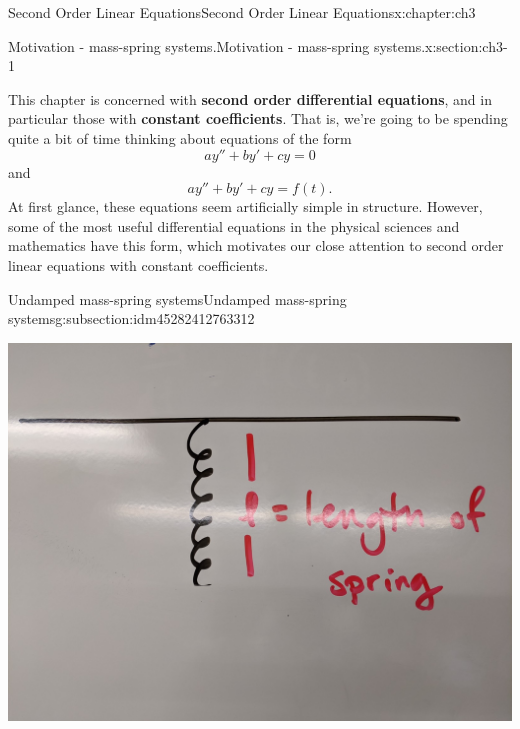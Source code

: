 \documentclass[oneside,10pt,]{book}
\newcommand{\terminology}[1]{\textbf{#1}}
\numberwithin{equation}{section}
\numberwithin{equation}{section}
\begin{document}
\begin{chapterptx}{Second Order Linear Equations}{}{Second Order Linear Equations}{}{}{x:chapter:ch3}
%
%
\typeout{************************************************}
\typeout{************************************************}
%
\begin{sectionptx}{Motivation - mass-spring systems.}{}{Motivation - mass-spring systems.}{}{}{x:section:ch3-1}
\begin{introduction}{}%
This chapter is concerned with \terminology{second order differential equations}, and in particular those with \terminology{constant coefficients}. That is, we're going to be spending quite a bit of time thinking about equations of the form%
\begin{equation*}
a y'' + b y' + c y = 0
\end{equation*}
and%
\begin{equation*}
a y'' + b y' + c y = f(t).
\end{equation*}
At first glance, these equations seem artificially simple in structure. However, some of the most useful differential equations in the physical sciences and mathematics have this form, which motivates our close attention to second order linear equations with constant coefficients.%
\end{introduction}%
%
%
\typeout{************************************************}
\typeout{************************************************}
%
\begin{subsectionptx}{Undamped mass-spring systems}{}{Undamped mass-spring systems}{}{}{g:subsection:idm45282412763312}
\begin{image}{0}{1}{0}%
\includegraphics[width=\linewidth]{images/spring_no_mass.jpg}

\end{image}
\end{subsectionptx}
\end{sectionptx}
\end{chapterptx}
\end{document}
